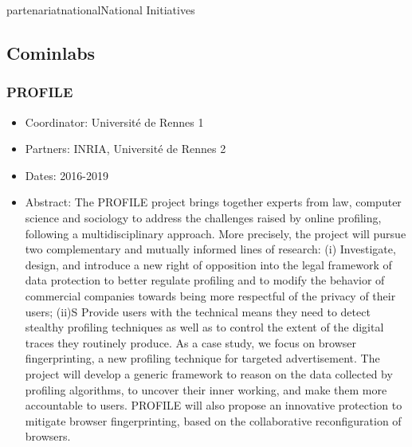\documentclass{ra2018}
\begin{document}
\begin{module}{partenariat}{national}{National Initiatives}
\subsection{Cominlabs}
\subsubsection*{\label{project:profile}PROFILE}

\begin{itemize}
	\item Coordinator: Universit\'e de Rennes 1
	\item Partners: INRIA, Universit\'e de Rennes 2
	\item Dates: 2016-2019
	\item Abstract:  The PROFILE project brings together experts from law, computer science and sociology to address the challenges raised by online profiling, following a multidisciplinary approach. More precisely, the project will pursue two complementary and mutually informed lines of research: (i) Investigate, design, and introduce a new right of opposition into the legal framework of data protection to better regulate profiling and to modify the behavior of commercial companies towards being more respectful of the privacy of their users; (ii)S Provide users with the technical means they need to detect stealthy profiling techniques as well as to control the extent of the digital traces they routinely produce. As a case study, we focus on browser fingerprinting, a new profiling technique for targeted advertisement. The project will develop a generic framework to reason on the data collected by profiling algorithms, to uncover their inner working, and make them more accountable to users. PROFILE will also propose an innovative protection to mitigate browser fingerprinting, based on the collaborative reconfiguration of browsers.
\end{itemize}

 \end{module} 




\end{document}
